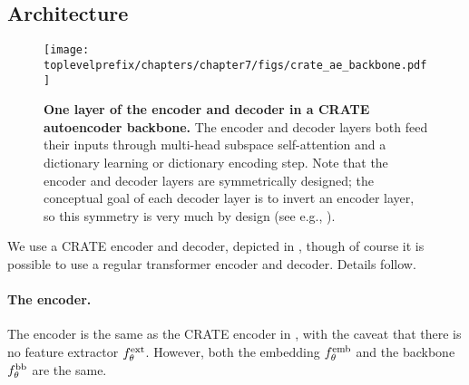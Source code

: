 \documentclass[../../book-main.tex]{subfiles}
\begin{document}
\subsection{Architecture}\label{sub:image_completion_architecture}

\begin{figure}
    \centering 
    \texttt{[image: \\toplevelprefix/chapters/chapter7/figs/crate\_ae\_backbone.pdf]}
    \caption{\small\textbf{One layer of the encoder and decoder in a CRATE autoencoder backbone.} The encoder and decoder layers both feed their inputs through multi-head subspace self-attention and a dictionary learning or dictionary encoding step. Note that the encoder and decoder layers are symmetrically designed; the conceptual goal of each decoder layer is to invert an encoder layer, so this symmetry is very much by design (see e.g., ).}
\end{figure}

We use a CRATE encoder and decoder, depicted in , though of course it is possible to use a regular transformer encoder and decoder. Details follow.

\paragraph{The encoder.} The encoder is the same as the CRATE encoder in , with the caveat that there is no feature extractor \(f_{\theta}^{\mathrm{ext}}\). However, both the embedding \(f_{\theta}^{\mathrm{emb}}\) and the backbone \(f_{\theta}^{\mathrm{bb}}\) are the same.
\end{document}
